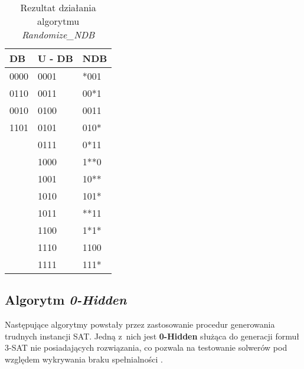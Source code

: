 \begin{table}[!htb]
    \centering
    \begin{tabular}{|l|l|l|}
    	\hline
    	DB   & U - DB & NDB  \\ \hline
    	0000 & 0001   & *001 \\
    	0110 & 0011   & 00*1 \\
    	0010 & 0100   & 0011 \\
    	1101 & 0101   & 010* \\
    	     & 0111   & 0*11 \\
    	     & 1000   & 1**0 \\
    	     & 1001   & 10**     \\
    	     & 1010   & 101*    \\
    	     & 1011   & **11     \\
    	     & 1100   & 1*1*     \\
    	     & 1110   & 1100    \\
    	     & 1111   & 111*     \\ \hline
    \end{tabular}
    \caption{Rezultat działania algorytmu \textit{Randomize\_NDB}}
    \label{tbl:randomized_results}
\end{table}

\newpage
\subsection{Algorytm \textit{0-Hidden}}
\label{sec:0hidden}
Następujące algorytmy powstały przez zastosowanie procedur generowania trudnych instancji SAT.
Jedną z~nich jest \textbf{0-Hidden} służąca do generacji formuł 3-SAT nie posiadających rozwiązania, co pozwala na testowanie solwerów 
pod względem wykrywania braku spełnialności \cite{GeneratingHardFormulasByHidingSolutionsDeceptively}.

